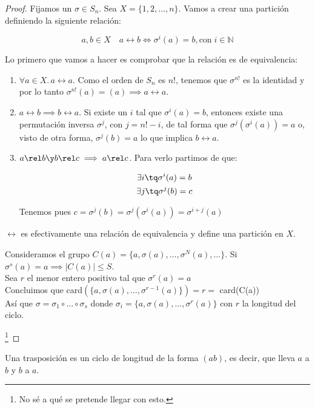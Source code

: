 \documentclass[nochap]{apuntes}
\begin{document}
\begin{proof}
Fijamos un $\sigma \in S_n$. Sea $X = \{ 1,2,\dotsc ,n\} $. Vamos a crear una partición definiendo la siguiente relación:

\[ a,b \in X\quad a\rel b \iff \sigma^i(a) = b, \text{con}\; i\in \mathbb{N} \]

Lo primero que vamos a hacer es comprobar que la relación es de equivalencia:

\begin{enumerate}
\item $\forall a \in X.\, a\rel a$. Como el orden de $S_n$ es $n!$, tenemos que $\sigma^{n!}$ es la identidad y por lo tanto $\sigma^{n!}(a) = (a) \implies a\rel a$.

\item $a\rel b \implies b\rel a$. Si existe un $i$ tal que $\sigma ^i (a) = b$, entonces existe una permutación inversa $σ^j$, con $j=n! - i$, de tal forma que $σ^j(σ^i(a)) = a$ o, visto de otra forma, $σ^j(b) = a$ lo que implica $b\rel a$.

\item $a\rel b \y b\rel c \implies a\rel c$. Para verlo partimos de que:

\begin{gather*}
\exists i \tq \sigma ^i (a) = b \\
\exists j \tq \sigma ^j (b) = c 
\end{gather*}

Tenemos pues $c=\sigma^j(b)=\sigma^j(\sigma ^i(a))=\sigma^{i+j}(a)$

\end{enumerate}

$\rel$ es efectivamente una relación de equivalencia y define una partición en $X$.

Consideramos el grupo $C(a) = \{ a, \sigma (a), \dotsc , \sigma ^N(a), \dotsc \}$. 
Si $\sigma ^s (a)=a \implies |C(a)| \leq S$.\\
Sea $r$ el menor entero positivo tal que $\sigma^r(a)=a$\\
Concluimos que card$(\{ a, \sigma (a), \hdots , \sigma ^{r-1}(a)\}) = r =$ card(C(a))\\
Así que $\sigma = \sigma _1 \circ \hdots \circ \sigma _s$
donde $\sigma _i = \{ a, \sigma (a), \hdots , \sigma ^r(a)\} $ con $r$ la longitud del ciclo.

\footnote{No sé a qué se pretende llegar con esto.}
\end{proof}

\begin{defn}[Trasposición] Una trasposición es un ciclo de longitud de la forma $(ab)$, es decir, que lleva $a$ a $b$ y $b$ a $a$.
\end{defn}
\end{document}
